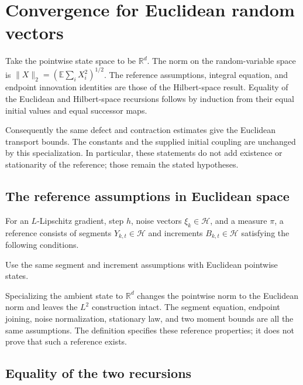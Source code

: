 \documentclass[11pt,a4paper]{report}
\begin{document}
\section{\texorpdfstring{Convergence for Euclidean random vectors}{Convergence for Euclidean random vectors}}
\label{proof-module-UnadjustedLangevin-L2Convergence-lean}


Take the pointwise state space to be \(\mathbb R^d\). The norm on the random-variable space is \(\|X\|_2=(\mathbb E\sum_iX_i^2)^{1/2}\). The reference assumptions, integral equation, and endpoint innovation identities are those of the Hilbert-space result. Equality of the Euclidean and Hilbert-space recursions follows by induction from their equal initial values and equal successor maps.



Consequently the same defect and contraction estimates give the Euclidean transport bounds. The constants and the supplied initial coupling are unchanged by this specialization. In particular, these statements do not add existence or stationarity of the reference; those remain the stated hypotheses.

\subsection{\texorpdfstring{The reference assumptions in Euclidean space}{The reference assumptions in Euclidean space}}
\label{report-step-UnadjustedLangevin-L2Convergence-lean-1}


For an \(L\)-Lipschitz gradient, step \(h\), noise vectors \(\xi_k\in\mathcal H\), and a measure \(\pi\), a reference consists of segments \(Y_{k,t}\in\mathcal H\) and increments \(B_{k,t}\in\mathcal H\) satisfying the following conditions.



Use the same segment and increment assumptions with Euclidean pointwise states.



Specializing the ambient state to \(\mathbb R^d\) changes the pointwise norm to the Euclidean norm and leaves the \(L^2\) construction intact. The segment equation, endpoint joining, noise normalization, stationary law, and two moment bounds are all the same assumptions. The definition specifies these reference properties; it does not prove that such a reference exists.

\subsection{\texorpdfstring{Equality of the two recursions}{Equality of the two recursions}}
\label{report-step-UnadjustedLangevin-L2Convergence-lean-2}
\end{document}
